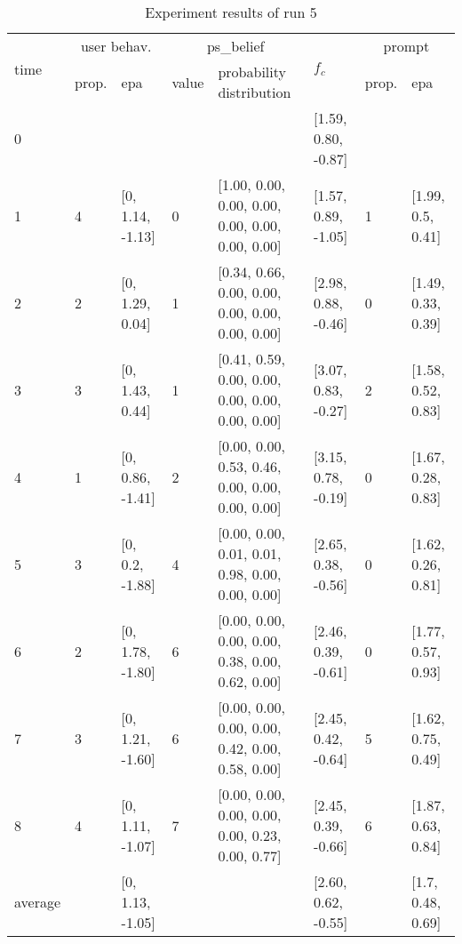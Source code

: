 \begin{table}[htbp]\footnotesize
\caption{Experiment results of run 5}
\begin{tabular}{|p{0.4cm}|p{0.6cm}|l|p{0.6cm}|p{3.3cm}|l|p{0.6cm}|l|}
\hline

\multirow{2}{*}{time} & \multicolumn{2}{c|}{user behav.} & \multicolumn{2}{c|}{ps\_belief} &
\multirow{2}{*}{$f_c$} & \multicolumn{2}{c|}{prompt} \\ \cline{2-5}\cline{ 7- 8}
& prop. & epa & value & probability distribution &  & prop. & epa \\ \hline

0 & \multicolumn{1}{l|}{} &  & \multicolumn{1}{l|}{} &  & [1.59, 0.80, -0.87] & \multicolumn{1}{l|}{} &  \\ \hline
1 & 4 & [0, 1.14, -1.13] & 0 & [1.00, 0.00, 0.00, 0.00, 0.00, 0.00, 0.00, 0.00] & [1.57, 0.89, -1.05] & 1 & [1.99, 0.5, 0.41] \\ \hline
2 & 2 & [0, 1.29, 0.04] & 1 & [0.34, 0.66, 0.00, 0.00, 0.00, 0.00, 0.00, 0.00] & [2.98, 0.88, -0.46] & 0 & [1.49, 0.33, 0.39] \\ \hline
3 & 3 & [0, 1.43, 0.44] & 1 & [0.41, 0.59, 0.00, 0.00, 0.00, 0.00, 0.00, 0.00] & [3.07, 0.83, -0.27] & 2 & [1.58, 0.52, 0.83] \\ \hline
4 & 1 & [0, 0.86, -1.41] & 2 & [0.00, 0.00, 0.53, 0.46, 0.00, 0.00, 0.00, 0.00] & [3.15, 0.78, -0.19] & 0 & [1.67, 0.28, 0.83] \\ \hline
5 & 3 & [0, 0.2, -1.88] & 4 & [0.00, 0.00, 0.01, 0.01, 0.98, 0.00, 0.00, 0.00] & [2.65, 0.38, -0.56] & 0 & [1.62, 0.26, 0.81] \\ \hline
6 & 2 & [0, 1.78, -1.80] & 6 & [0.00, 0.00, 0.00, 0.00, 0.38, 0.00, 0.62, 0.00] & [2.46, 0.39, -0.61] & 0 & [1.77, 0.57, 0.93] \\ \hline
7 & 3 & [0, 1.21, -1.60] & 6 & [0.00, 0.00, 0.00, 0.00, 0.42, 0.00, 0.58, 0.00] & [2.45, 0.42, -0.64] & 5 & [1.62, 0.75, 0.49] \\ \hline
8 & 4 & [0, 1.11, -1.07] & 7 & [0.00, 0.00, 0.00, 0.00, 0.00, 0.23, 0.00, 0.77] & [2.45, 0.39, -0.66] & 6 & [1.87, 0.63, 0.84] \\ \hline
\multicolumn{1}{|l|}{average} & \multicolumn{1}{l|}{} & [0, 1.13, -1.05] & \multicolumn{1}{l|}{} &  & [2.60, 0.62, -0.55] & \multicolumn{1}{l|}{} & [1.7, 0.48, 0.69] \\ \hline
\end{tabular}
\label{}
\end{table}


